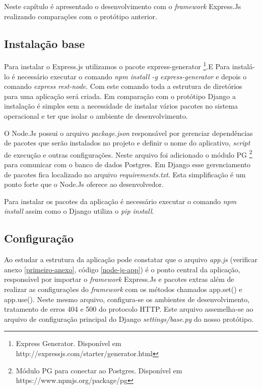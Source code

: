   Neste capítulo é apresentado o desenvolvimento com o \textit{framework} Express.Js realizando comparações com o protótipo
  anterior. 

\subsection{Instalação base}

  Para instalar o Express.js utilizamos o pacote express-generator \footnote[11]{Express Generator. Disponível em http://expressjs.com/starter/generator.html}.E
  Para instalá-lo é necessário executar o comando \textit{npm install -g express-generator} e depois o comando \textit{express rest-node}.
  Com este comando toda a estrutura de diretórios para uma aplicação será criada. Em comparação com o protótipo Django a instalação é
  simples sem a necessidade de instalar vários pacotes no sistema operacional e ter que isolar o ambiente de desenvolvimento.
  
  O Node.Js possui o arquivo \textit{package.json} responsável por gerenciar dependências de pacotes que serão instalados no projeto 
  e definir o nome do aplicativo, \textit{script} de execução e outras configurações. Neste arquivo foi adicionado o módulo PG \footnote[12]{Módulo PG para conectar ao Postgres. Disponível em https://www.npmjs.org/package/pg}
  para comunicar com o banco de dados Postgres. Em Django esse gerenciamento de pacotes fica localizado no arquivo
  \textit{requirements.txt}. Esta simplificação é um ponto forte que o Node.Js oferece ao desenvolvedor.
  
  Para instalar os pacotes da aplicação é necessário executar o comando \textit{npm install} assim como o Django utiliza o 
  \textit{pip install}.

\subsection{Configuração}

  Ao estudar a estrutura da aplicação pode constatar que o arquivo \textit{app.js} (verificar anexo \ref{primeiro-anexo}, código \ref{node-js-app})
  é o ponto central da aplicação, responsável por importar o \textit{framework} Express.Js e 
  pacotes extras além de realizar as configurações do \textit{framework} com os métodos chamados app.set() e app.use().
  Neste mesmo arquivo, configura-se os ambientes de desenvolvimento, tratamento de erros 404 e 500 do protocolo HTTP. 
  Este arquivo assemelha-se ao arquivo de configuração principal do Django \textit{settings/base.py} do nosso protótipo.


